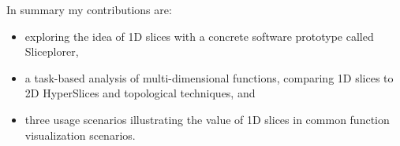 
In summary my contributions are: 
\begin{itemize}
\item exploring the idea of 1D slices with a concrete software prototype called Sliceplorer,
\item a task-based analysis of multi-dimensional functions, comparing 1D slices to 2D HyperSlices and topological techniques, and
\item %
three usage scenarios illustrating the value of 1D slices in common function 
      visualization scenarios. %
\end{itemize}


